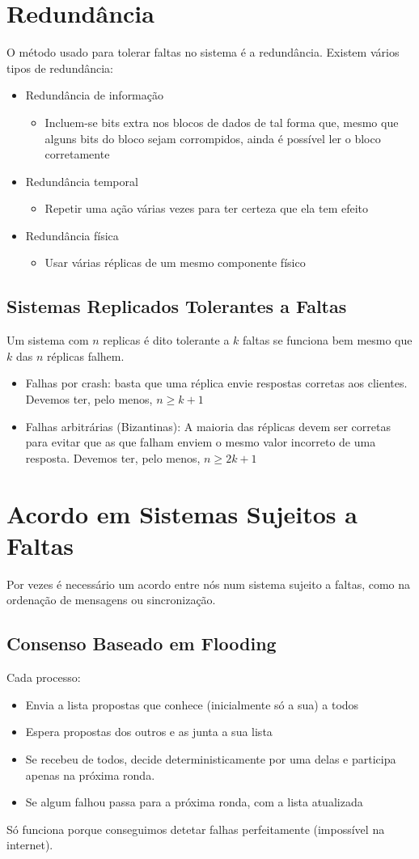 \documentclass[10pt,a4paper]{report}
\begin{document}
\section{Redundância}
O método usado para tolerar faltas no sistema é a redundância. Existem vários tipos de redundância:
\begin{itemize}
\item Redundância de informação
\begin{itemize}
\item Incluem-se bits extra nos blocos de dados de tal forma que, mesmo que alguns bits do bloco sejam corrompidos, ainda é possível ler o bloco corretamente
\end{itemize}
\item Redundância temporal
\begin{itemize}
\item Repetir uma ação várias vezes para ter certeza que ela tem efeito
\end{itemize}
\item Redundância física
\begin{itemize}
\item Usar várias réplicas de um mesmo componente físico
\end{itemize}
\end{itemize}
\subsection{Sistemas Replicados Tolerantes a Faltas}
Um sistema com $n$ replicas é dito tolerante a $k$ faltas se funciona bem mesmo que $k$ das $n$ réplicas falhem.
\begin{itemize}
\item Falhas por crash: basta que uma réplica envie respostas corretas aos clientes. Devemos ter, pelo menos, $n \geq k + 1$
\item Falhas arbitrárias (Bizantinas): A maioria das réplicas devem ser corretas para evitar que as que falham enviem o mesmo valor incorreto de uma resposta. Devemos ter, pelo menos, $n \geq 2k + 1$
\end{itemize}
\section{Acordo em Sistemas Sujeitos a Faltas}
Por vezes é necessário um acordo entre nós num sistema sujeito a faltas, como na ordenação de mensagens ou sincronização.
\subsection{Consenso Baseado em Flooding}
Cada processo:
\begin{itemize}
\item Envia a lista propostas que conhece (inicialmente só a sua) a todos
\item Espera propostas dos outros e as junta a sua lista
\item Se recebeu de todos, decide deterministicamente por uma delas e participa apenas na próxima ronda.
\item Se algum falhou passa para a próxima ronda, com a lista atualizada
\end{itemize}
Só funciona porque conseguimos detetar falhas perfeitamente (impossível na internet).
\end{document}
